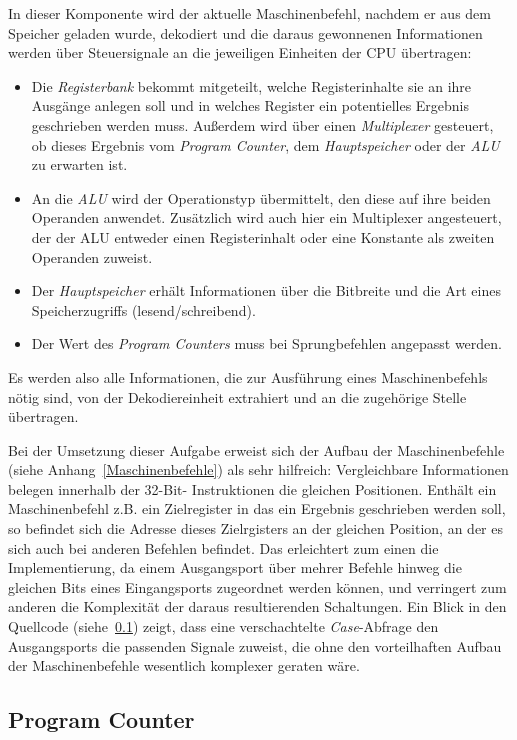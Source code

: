 In dieser Komponente wird der aktuelle Maschinenbefehl, nachdem er aus dem Speicher geladen wurde, dekodiert und die daraus gewonnenen Informationen werden über Steuersignale an die jeweiligen Einheiten der CPU übertragen:
\begin{itemize}
    \item Die \textit{Registerbank} bekommt mitgeteilt, welche Registerinhalte sie an ihre Ausgänge anlegen soll und in welches Register ein potentielles Ergebnis geschrieben werden muss.
        Außerdem wird über einen \textit{Multiplexer} gesteuert, ob dieses Ergebnis vom \textit{Program Counter}, dem \textit{Hauptspeicher} oder der \textit{ALU} zu erwarten ist.
    \item An die \textit{ALU} wird der Operationstyp übermittelt, den diese auf ihre beiden Operanden anwendet.
        Zusätzlich wird auch hier ein Multiplexer angesteuert, der der ALU entweder einen Registerinhalt oder eine Konstante als zweiten Operanden zuweist.
    \item Der \textit{Hauptspeicher} erhält Informationen über die Bitbreite und die Art eines Speicherzugriffs (lesend/schreibend).
    \item Der Wert des \textit{Program Counters} muss bei Sprungbefehlen angepasst werden.
\end{itemize}
Es werden also alle Informationen, die zur Ausführung eines Maschinenbefehls nötig sind, von der Dekodiereinheit extrahiert und an die zugehörige Stelle übertragen. 

Bei der Umsetzung dieser Aufgabe erweist sich der Aufbau der Maschinenbefehle (siehe Anhang~\ref{Maschinenbefehle}) als sehr hilfreich:
Vergleichbare Informationen belegen innerhalb der 32-Bit- Instruktionen die gleichen Positionen.
Enthält ein Maschinenbefehl z.B. ein Zielregister in das ein Ergebnis geschrieben werden soll, so befindet sich die Adresse dieses Zielrgisters an der gleichen Position, an der es sich auch bei anderen Befehlen befindet.
Das erleichtert zum einen die Implementierung, da einem Ausgangsport über mehrer Befehle hinweg die gleichen Bits eines Eingangsports zugeordnet werden können, und verringert zum anderen die Komplexität der daraus resultierenden Schaltungen. 
Ein Blick in den Quellcode (siehe~\ref{}) zeigt, dass eine verschachtelte \textit{Case}-Abfrage den Ausgangsports die passenden Signale zuweist, die ohne den vorteilhaften Aufbau der Maschinenbefehle wesentlich komplexer geraten wäre.

\subsection{Program Counter}

